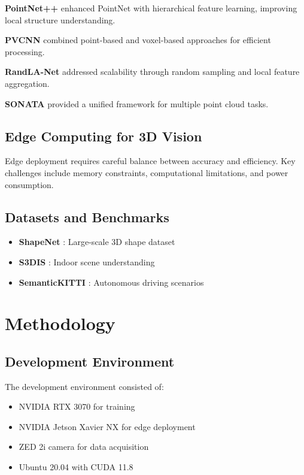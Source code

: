 \documentclass[12pt,a4paper]{report}
\begin{document}
\textbf{PointNet++} \cite{qi2017pointnetplus} enhanced PointNet with hierarchical feature learning, improving local structure understanding.

\textbf{PVCNN} \cite{liu2019point} combined point-based and voxel-based approaches for efficient processing.

\textbf{RandLA-Net} \cite{hu2020randla} addressed scalability through random sampling and local feature aggregation.

\textbf{SONATA} \cite{facebook2023sonata} provided a unified framework for multiple point cloud tasks.

\section{Edge Computing for 3D Vision}

Edge deployment requires careful balance between accuracy and efficiency. Key challenges include memory constraints, computational limitations, and power consumption.

\section{Datasets and Benchmarks}

\begin{itemize}
    \item \textbf{ShapeNet} \cite{chang2015shapenet}: Large-scale 3D shape dataset
    \item \textbf{S3DIS} \cite{armeni2016s3dis}: Indoor scene understanding
    \item \textbf{SemanticKITTI} \cite{behley2019semantickitti}: Autonomous driving scenarios
\end{itemize}

\chapter{Methodology}

\section{Development Environment}

The development environment consisted of:
\begin{itemize}
    \item NVIDIA RTX 3070 for training
    \item NVIDIA Jetson Xavier NX for edge deployment
    \item ZED 2i camera for data acquisition
    \item Ubuntu 20.04 with CUDA 11.8
\end{itemize}
\end{document}

